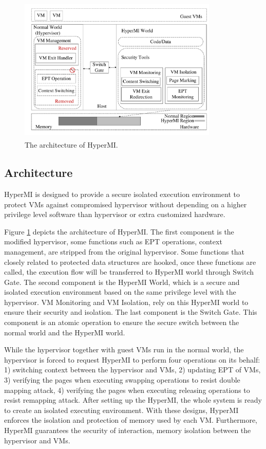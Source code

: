 \documentclass[conference]{IEEEtran}
\begin{document}
\begin{figure}
\centerline{\includegraphics[width=9.5cm, height=7cm]{pdfvmcs1.pdf}}%
\caption{The architecture of HyperMI. } \label{fig1}
\end{figure}

\subsection{Architecture} 
HyperMI is designed to provide a secure isolated execution environment to protect VMs against compromised hypervisor without depending on a higher privilege level software than hypervisor or extra customized hardware.



Figure \ref{fig1} depicts the architecture of HyperMI. The first component is the modified hypervisor, some functions such as EPT operations, context management, are stripped from the original hypervisor. Some functions that closely related to protected data structures are hooked, once these functions are called, the execution flow will be transferred to HyperMI world through Switch Gate. The second component is the HyperMI World, which is a secure and isolated execution environment based on the same privilege level with the hypervisor. VM Monitoring and VM Isolation, rely on this HyperMI world to ensure their security and isolation. The last component is the Switch Gate. This component is an atomic operation to ensure the secure switch between the normal world and the HyperMI world. 


While the hypervisor together with guest VMs run in the normal world, the hypervisor is forced to request HyperMI to perform four operations on its behalf: 1) switching context between the hypervisor and VMs, 2) updating EPT of VMs, 3) verifying the pages when executing swapping operations to resist double mapping attack, 4) verifying the pages when executing releasing operations to resist remapping attack. After setting up the HyperMI, the whole system is ready to create an isolated executing environment. With these designs, HyperMI enforces the isolation and protection of memory used by each VM. Furthermore, HyperMI guarantees the security of interaction, memory isolation between the hypervisor and VMs.
\end{document}
